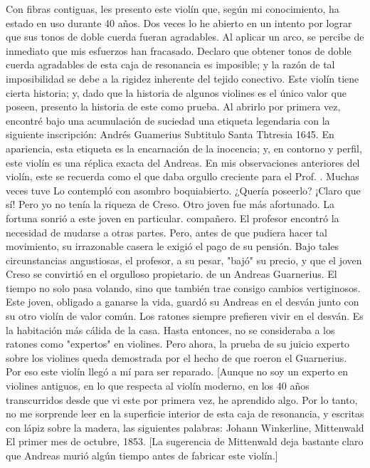 Con fibras contiguas, les presento este violín que, según mi conocimiento, ha estado en uso durante 40 años. Dos veces lo he abierto en un intento por lograr que sus tonos de doble cuerda fueran agradables. Al aplicar un arco, se percibe de inmediato que mis esfuerzos han fracasado. Declaro que obtener tonos de doble cuerda agradables de esta caja de resonancia es imposible; y la razón de tal imposibilidad se debe a la rigidez inherente del tejido conectivo. Este violín tiene cierta historia; y, dado que la historia de algunos violines es el único valor que poseen, presento la historia de este como prueba. Al abrirlo por primera vez, encontré bajo una acumulación de suciedad una etiqueta legendaria con la siguiente inscripción:
Andrés Guamerius
Subtitulo Santa Thtresia 1645. En apariencia, esta etiqueta es la encarnación de la inocencia; y, en contorno y perfil, este violín es una réplica exacta del Andreas. En mis observaciones anteriores del violín, este se recuerda como el que daba
orgullo creciente para el Prof. . Muchas veces tuve
Lo contempló con asombro boquiabierto. ¿Quería poseerlo? ¡Claro que sí! Pero yo no tenía la riqueza de Creso. Otro joven fue más afortunado. La fortuna sonrió a este joven en particular.
compañero. El profesor encontró la necesidad de mudarse a
otras partes. Pero, antes de que pudiera hacer tal movimiento, su irrazonable casera le exigió el pago de su pensión. Bajo tales circunstancias angustiosas, el profesor, a su pesar, "bajó" su precio,
y que el joven Creso se convirtió en el orgulloso propietario.
de un Andreas Guarnerius. El tiempo no solo pasa volando, sino que también trae consigo cambios vertiginosos. Este joven, obligado a ganarse la vida, guardó su Andreas en el desván junto con su otro violín de valor común. Los ratones siempre prefieren vivir en el desván. Es la habitación más cálida de la casa. Hasta entonces, no se consideraba a los ratones como "expertos" en violines. Pero ahora, la prueba de su juicio experto sobre los violines queda demostrada por el hecho de que roeron el Guarnerius. Por eso este violín llegó a mí para ser reparado.
[Aunque no soy un experto en violines antiguos, en lo que respecta al violín moderno, en los 40 años transcurridos desde que vi este por primera vez, he aprendido algo. Por lo tanto, no me sorprende leer en la superficie interior de esta caja de resonancia, y escritas con lápiz sobre la madera, las siguientes palabras:
Johann Winkerline, Mittenwald El primer mes de octubre, 1853.
[La sugerencia de Mittenwald deja bastante claro que Andreas murió algún tiempo antes de fabricar este violín.]
